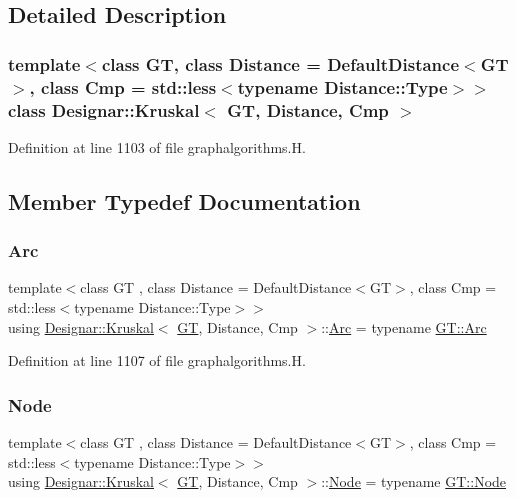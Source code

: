 \subsection{Detailed Description}
\subsubsection*{template$<$class GT, class Distance = Default\+Distance$<$\+G\+T$>$, class Cmp = std\+::less$<$typename Distance\+::\+Type$>$$>$\newline
class Designar\+::\+Kruskal$<$ G\+T, Distance, Cmp $>$}



Definition at line 1103 of file graphalgorithms.\+H.



\subsection{Member Typedef Documentation}
\mbox{\label{class_designar_1_1_kruskal_a90eba06ada80f8b0b010782c15c0e52a}} 
\subsubsection{\texorpdfstring{Arc}{Arc}}
{\footnotesize\ttfamily template$<$class GT , class Distance  = Default\+Distance$<$\+G\+T$>$, class Cmp  = std\+::less$<$typename Distance\+::\+Type$>$$>$ \\
using \hyperlink{class_designar_1_1_kruskal}{Designar\+::\+Kruskal}$<$ \hyperlink{demo-buildgraph_8_c_a3001c40d2c31ca87ed96cd7d1334a55e}{GT}, Distance, Cmp $>$\+::\hyperlink{class_designar_1_1_kruskal_a90eba06ada80f8b0b010782c15c0e52a}{Arc} =  typename \hyperlink{class_designar_1_1_graph_a74c730ef4ce2d20f998d72bd25c2b5bf}{G\+T\+::\+Arc}}



Definition at line 1107 of file graphalgorithms.\+H.

\mbox{\label{class_designar_1_1_kruskal_ae877bf49a387ddf132cfd824a0d258dd}} 
\subsubsection{\texorpdfstring{Node}{Node}}
{\footnotesize\ttfamily template$<$class GT , class Distance  = Default\+Distance$<$\+G\+T$>$, class Cmp  = std\+::less$<$typename Distance\+::\+Type$>$$>$ \\
using \hyperlink{class_designar_1_1_kruskal}{Designar\+::\+Kruskal}$<$ \hyperlink{demo-buildgraph_8_c_a3001c40d2c31ca87ed96cd7d1334a55e}{GT}, Distance, Cmp $>$\+::\hyperlink{class_designar_1_1_kruskal_ae877bf49a387ddf132cfd824a0d258dd}{Node} =  typename \hyperlink{class_designar_1_1_graph_a5dfc7dba9d092ac489c72e40390c37d0}{G\+T\+::\+Node}}



